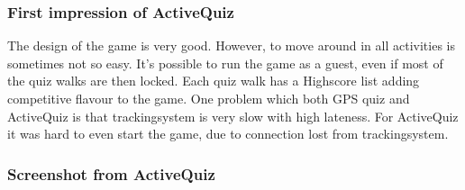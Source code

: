 \documentclass{TDP003mall}
\begin{document}
\subsubsection{First impression of ActiveQuiz}
The design of the game is very good. However, to move around in all activities is sometimes
not so easy. It's possible to run the game as a guest, even if most of the quiz walks are then
locked. Each quiz walk has a Highscore list adding competitive flavour to the game.
One problem which both GPS quiz and ActiveQuiz is that trackingsystem is very slow with high
lateness. For ActiveQuiz it was hard to even start the game, due to connection lost
from trackingsystem.

\subsubsection{Screenshot from ActiveQuiz}
\end{document}

